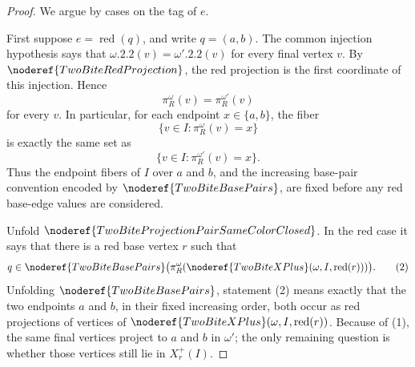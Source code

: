 \begin{proof}
We argue by cases on the tag of \(e\).

First suppose \(e=\operatorname{red}(q)\), and write \(q=(a,b)\).  The common
injection hypothesis says that
\(\omega.2.2(v)=\omega'.2.2(v)\) for every final vertex \(v\).  By
\(\noderef{TwoBiteRedProjection}\), the red projection is the first coordinate
of this injection.  Hence
\[
\pi_R^\omega(v)=\pi_R^{\omega'}(v)
\tag{1}
\]
for every \(v\).  In particular, for each endpoint \(x\in\{a,b\}\), the fiber
\[
\{v\in I:\pi_R^\omega(v)=x\}
\]
is exactly the same set as
\[
\{v\in I:\pi_R^{\omega'}(v)=x\}.
\]
Thus the endpoint fibers of \(I\) over \(a\) and \(b\), and the increasing
base-pair convention encoded by \(\noderef{TwoBiteBasePairs}\), are fixed
before any red base-edge values are considered.

Unfold
\(\noderef{TwoBiteProjectionPairSameColorClosed}\).  In the red case it says
that there is a red base vertex \(r\) such that
\[
q\in
\noderef{TwoBiteBasePairs}
\bigl(\pi_R^\omega(
\noderef{TwoBiteXPlus}(\omega,I,\operatorname{red}(r)))\bigr).
\tag{2}
\]
Unfolding \(\noderef{TwoBiteBasePairs}\), statement (2) means exactly that
the two endpoints \(a\) and \(b\), in their fixed increasing order, both occur
as red projections of vertices of
\(\noderef{TwoBiteXPlus}(\omega,I,\operatorname{red}(r))\).  Because of
(1), the same final vertices project to \(a\) and \(b\) in \(\omega'\); the
only remaining question is whether those vertices still lie in \(X_r^+(I)\).


\end{proof}

